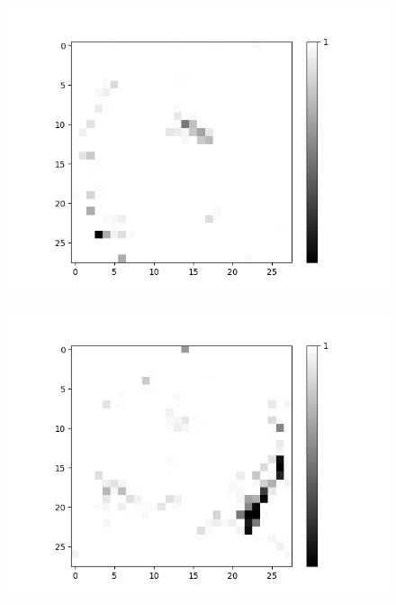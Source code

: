\begin{figure}[H]
\begin{minipage}[b]{0.19\textwidth}
		\includegraphics[width=\textwidth]{OR-AND(OLD)(W-LSM)(1)/Layer0-Neuron-10.png}
		\label{}
	\end{minipage}
	\begin{minipage}[b]{0.19\textwidth}
		\captionsetup{labelformat=empty}
		\includegraphics[width=\textwidth]{OR-AND(OLD)(W-LSM)(1)/Layer0-Neuron-14.png}
		\label{}
	\end{minipage}
		\begin{minipage}[b]{0.19\textwidth}
		\captionsetup{labelformat=empty}

\end{minipage}
\end{figure}

